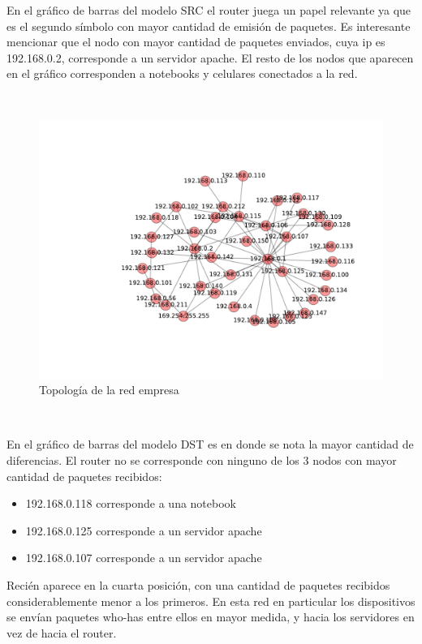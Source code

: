 En el gráfico de barras del modelo SRC el router juega un papel relevante ya que es el segundo
símbolo con mayor cantidad de emisión de paquetes. Es interesante mencionar que el 
nodo con mayor cantidad de paquetes enviados, cuya ip es 192.168.0.2, corresponde a un servidor apache.
El resto de los nodos que aparecen en el gráfico corresponden a notebooks
y celulares conectados a la red.

~

\begin{figure}[!h]
	\begin{center}
		  \includegraphics[scale=0.75]{resultados/empresa/conectividadNX.pdf}
		  \caption{Topología de la red empresa}
		  \label{fig:contra1}
	\end{center}
\end{figure}

~

En el gráfico de barras del modelo DST es en donde se nota la mayor cantidad de diferencias. 
El router no se corresponde con ninguno de los 3 nodos con mayor cantidad de paquetes
recibidos:

\begin{itemize}
    \item 192.168.0.118 corresponde a una notebook
    \item 192.168.0.125 corresponde a un servidor apache
    \item 192.168.0.107 corresponde a un servidor apache
\end{itemize}

Recién aparece en la cuarta posición, con una cantidad de paquetes recibidos considerablemente
menor a los primeros. En esta red en particular los dispositivos se envían paquetes
who-has entre ellos en mayor medida, y hacia los servidores en vez de hacia el router.

